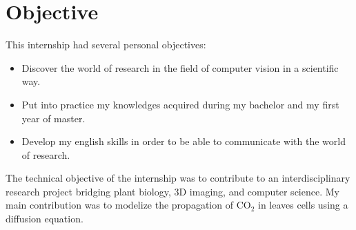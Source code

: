 \chapter{Objective}

This internship had several personal objectives:

\begin{itemize}
    \item Discover the world of research in the field of computer vision in
    a scientific way.
    \item Put into practice my knowledges acquired during my bachelor and my
    first year of master.
    \item Develop my english skills in order to be able to communicate with
    the world of research.
\end{itemize}
%
The technical objective of the internship was to contribute to an interdisciplinary
research project bridging plant biology, 3D imaging, and computer science.
My main contribution was to modelize the propagation of $\mathrm{CO_2}$ in leaves
cells using a diffusion equation.
